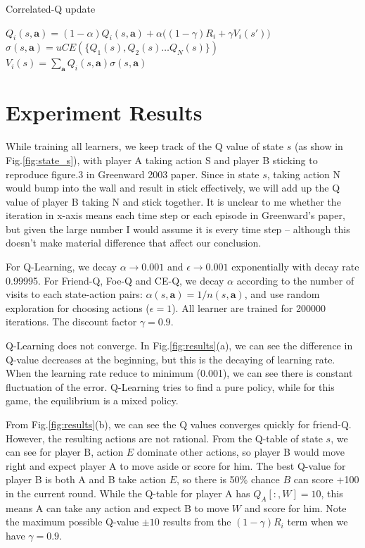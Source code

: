 \documentclass[conference]{IEEEtran}
\begin{document}
\begin{algorithm}[h!]
	\caption{Correlated-Q update}
	\begin{algorithmic}
			\State $Q_i(s, \mathbf{a}) = (1-\alpha) Q_i(s, \mathbf{a}) + \alpha  \big( (1-\gamma) R_i + \gamma V_i(s') \big)$
		\EndFor
		\State $\sigma(s, \mathbf{a}) = uCE(\{Q_1(s), Q_2(s)\dots Q_N(s)\})$ 
		\State $V_i(s) = \sum_{\mathbf{a}} Q_i(s, \mathbf{a}) \sigma(s, \mathbf{a})$
		\EndFor
		\EndFunction
	\end{algorithmic}
	\label{algo:ce-Q}
\end{algorithm}

\section{Experiment Results}
While training all learners, we keep track of the Q value of state $s$ (as show in Fig.\ref{fig:state_s}), with player A taking action S and player B sticking to reproduce figure.3 in Greenward 2003 paper. Since in state $s$, taking action N would bump into the wall and result in stick effectively, we will add up the Q value of player B taking N and stick together. It is unclear to me whether the iteration in x-axis means each time step or each episode in Greenward's paper, but given the large number I would assume it is every time step -- although this doesn't make material difference that affect our conclusion. 

For Q-Learning, we decay $\alpha\rightarrow0.001$ and $\epsilon\rightarrow0.001$ exponentially with decay rate 0.99995. For Friend-Q, Foe-Q and CE-Q, we decay $\alpha$ according to the number of visits to each state-action pairs: $\alpha(s,\mathbf{a})=1/n(s,\mathbf{a})$, and use random exploration for choosing actions ($\epsilon=1$). All learner are trained for 200000 iterations. The discount factor $\gamma=0.9$.

Q-Learning does not converge. In Fig.\ref{fig:results}(a), we can see the difference in Q-value decreases at the beginning, but this is the decaying of learning rate. When the learning rate reduce to minimum (0.001), we can see there is constant fluctuation of the error. Q-Learning tries to find a pure policy, while for this game, the equilibrium is a mixed policy.

From Fig.\ref{fig:results}(b), we can see the Q values converges quickly for friend-Q. However, the resulting actions are not rational. From the Q-table of state $s$, we can see for player B, action $E$ dominate other actions, so player B would move right and expect player A to move aside or score for him. The best Q-value for player B is both A and B take action $E$, so there is 50\% chance $B$ can score +100 in the current round. While the Q-table for player A has $Q_A[:, W]=10$, this means A can take any action and expect B to move $W$ and score for him. Note the maximum possible Q-value $\pm10$ results from the $(1-\gamma)R_i$ term when we have $\gamma=0.9$.
\end{document}
